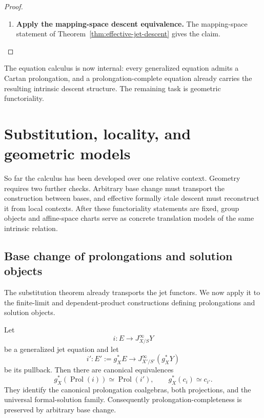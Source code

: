 \begin{proof}
\leavevmode
\begin{enumerate}[label=\textup{(\arabic*)}]
    \item \textbf{Apply the mapping-space descent equivalence.}
The mapping-space statement of Theorem~\ref{thm:effective-jet-descent} gives the
claim.
\end{enumerate}
\end{proof}

The equation calculus is now internal: every generalized equation admits a
Cartan prolongation, and a prolongation-complete equation already carries the
resulting intrinsic descent structure. The remaining task is geometric
functoriality.

\section{Substitution, locality, and geometric models}
\label{sec:jets-locality-models}

So far the calculus has been developed over one relative context. Geometry
requires two further checks. Arbitrary base change must transport the
construction between bases, and effective formally \(\acute{e}\)tale descent
must reconstruct it from local contexts. After these functoriality statements
are fixed, group objects and affine-space charts serve as concrete translation
models of the same intrinsic relation.

\subsection{Base change of prolongations and solution objects}
\label{sec:jet-base-change-consequences}

The substitution theorem already transports the jet functors. We now apply it
to the finite-limit and dependent-product constructions defining
prolongations and solution objects.
\begin{corollary}
Let
\[
  i:E\to J^\infty_{X/S}Y
\]
be a generalized jet equation and let
\[
  i':E':=g_X^*E
  \longrightarrow
  J^\infty_{X'/S'}(g_X^*Y)
\]
be its pullback. Then there are canonical equivalences
\[
  g_X^*(\operatorname{Prol}(i))\simeq\operatorname{Prol}(i'),
  \qquad
  g_X^*(c_i)\simeq c_{i'}.
\]
They identify the canonical prolongation coalgebras, both projections, and the
universal formal-solution family. Consequently prolongation-completeness is
preserved by arbitrary base change.
\end{corollary}

